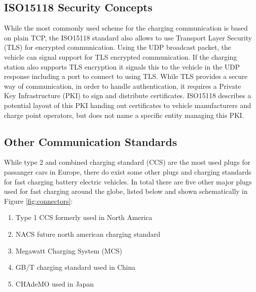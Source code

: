 \documentclass[conference,flushend]{iaria} %
\begin{document}

\subsection{ISO15118 Security Concepts} \label{sec:iso15118tls}
While the most commonly used scheme for the charging communication is based on plain TCP, the ISO15118 standard also allows to use Transport Layer Security (TLS) for encrypted communication.
Using the UDP broadcast packet, the vehicle can signal support for TLS encrypted communication.
If the charging station also supports TLS encryption it signals this to the vehicle in the UDP response including a port to connect to using TLS.
While TLS provides a secure way of communication, in order to handle authentication, it requires a Private Key Infrastructure (PKI) to sign and distribute certificates.
ISO15118 describes a potential layout of this PKI handing out certificates to vehicle manufacturers and charge point operators, but does not name a specific entity managing this PKI.



\subsection{Other Communication Standards}
While type 2 and combined charging standard (CCS) are the most used plugs for passanger cars in Europe, there do exist some other plugs and charging standards for fast charging battery electric vehicles.
In total there are five other major plugs used for fast charging around the globe, listed below and shown schematically in Figure \ref{fig:connectors}:

\begin{enumerate}
\item Type 1 CCS formerly used in North America
\item NACS future north american charging standard
\item Megawatt Charging System (MCS)
\item GB/T charging standard used in China
\item CHAdeMO used in Japan
\end{enumerate}
\end{document}

